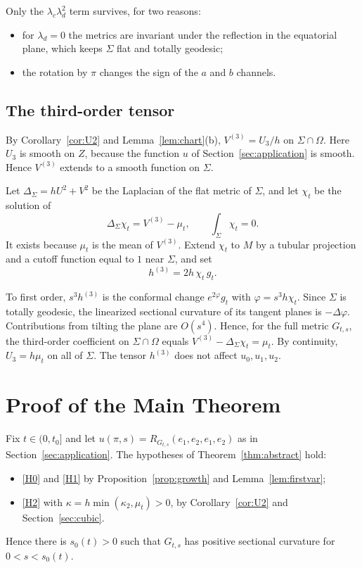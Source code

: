 \documentclass[11pt]{amsart}
\theoremstyle{definition}
\theoremstyle{remark}
\begin{document}
Only the $\lambda_c\lambda_d^2$ term survives, for two reasons:
\begin{itemize}[leftmargin=*]
\item for $\lambda_d=0$ the metrics are invariant under the reflection in the equatorial plane, which keeps $\Sigma$ flat and totally geodesic;
\item the rotation by $\pi$ changes the sign of the $a$ and $b$ channels.
\end{itemize}

\subsection{The third-order tensor}
By Corollary~\ref{cor:U2} and Lemma~\ref{lem:chart}(b), $V^{(3)}=U_3/h$ on $\Sigma\cap\Omega$. Here $U_3$ is smooth on $Z$, because the function $u$ of Section~\ref{sec:application} is smooth. Hence $V^{(3)}$ extends to a smooth function on $\Sigma$.

Let $\Delta_\Sigma=hU^2+V^2$ be the Laplacian of the flat metric of $\Sigma$, and let $\chi_t$ be the solution of
\[ \Delta_\Sigma\chi_t=V^{(3)}-\mu_t,\qquad\int_\Sigma\chi_t=0 . \]
It exists because $\mu_t$ is the mean of $V^{(3)}$. Extend $\chi_t$ to $M$ by a tubular projection and a cutoff function equal to $1$ near $\Sigma$, and set
\[ h^{(3)}=2h\,\chi_t\,g_t . \]

To first order, $s^3h^{(3)}$ is the conformal change $e^{2\varphi}g_t$ with $\varphi=s^3h\chi_t$. Since $\Sigma$ is totally geodesic, the linearized sectional curvature of its tangent planes is $-\Delta\varphi$. Contributions from tilting the plane are $O(s^4)$. Hence, for the full metric $G_{t,s}$, the third-order coefficient on $\Sigma\cap\Omega$ equals $V^{(3)}-\Delta_\Sigma\chi_t=\mu_t$. By continuity, $U_3=h\mu_t$ on all of $\Sigma$. The tensor $h^{(3)}$ does not affect $u_0,u_1,u_2$.

\section{Proof of the Main Theorem}\label{sec:proof}

Fix $t\in(0,t_0]$ and let $u(\pi,s)=R_{G_{t,s}}(e_1,e_2,e_1,e_2)$ as in Section~\ref{sec:application}. The hypotheses of Theorem~\ref{thm:abstract} hold:
\begin{itemize}[leftmargin=*]
\item \ref{H0} and \ref{H1} by Proposition~\ref{prop:growth} and Lemma~\ref{lem:firstvar};
\item \ref{H2} with $\kappa=h\min(\kappa_2,\mu_t)>0$, by Corollary~\ref{cor:U2} and Section~\ref{sec:cubic}.
\end{itemize}
Hence there is $s_0(t)>0$ such that $G_{t,s}$ has positive sectional curvature for $0<s<s_0(t)$.
\end{document}
